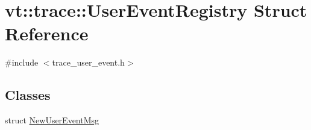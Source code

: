 \hypertarget{structvt_1_1trace_1_1_user_event_registry}{}\section{vt\+:\+:trace\+:\+:User\+Event\+Registry Struct Reference}
\label{structvt_1_1trace_1_1_user_event_registry}


{\ttfamily \#include $<$trace\+\_\+user\+\_\+event.\+h$>$}

\subsection*{Classes}
\begin{DoxyCompactItemize}
\item 
struct \hyperlink{structvt_1_1trace_1_1_user_event_registry_1_1_new_user_event_msg}{New\+User\+Event\+Msg}
\end{DoxyCompactItemize}

